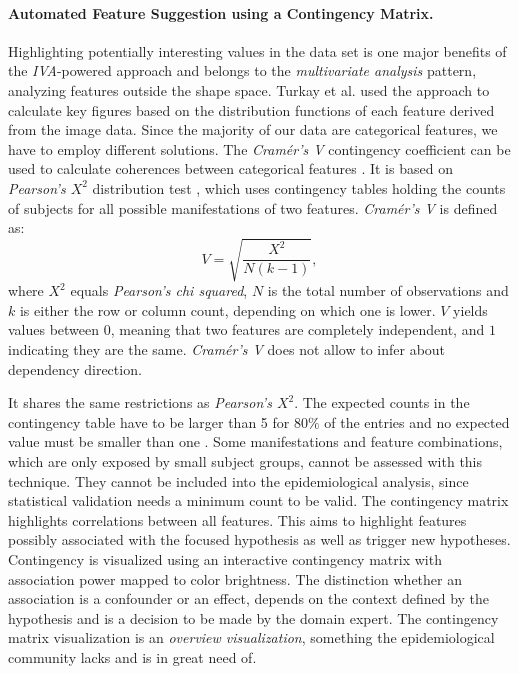 \documentclass[journal]{style/vgtc} 			          %
\newcommand{\rem}[1]{\textcolor{red}{\sout{#1}}}
\begin{document}
\paragraph{Automated Feature Suggestion using a Contingency Matrix.}
Highlighting potentially interesting values in the data set is one major benefits of the \emph{IVA}-powered approach and belongs to the \emph{multivariate analysis} pattern,  analyzing features outside the shape space.
%
Turkay et al. \cite{Turkay2013} used the approach to calculate key figures based on the distribution functions of each feature derived from the image data.
%
Since the majority of our data are categorical features, we have to employ different solutions.
%
The \emph{Cram\'{e}r's V} contingency coefficient can be used to calculate coherences between categorical features \cite{CramerV}.
%
It is based on \emph{Pearson's $X^2$} distribution test \cite{ChiSquare}, which uses contingency tables holding the counts of subjects for all possible manifestations of two features.
%
\emph{Cram\'{e}r's V} is defined as:
\begin{equation}
V = \sqrt{\frac{X^2}{N(k-1)}},
\end{equation}
where $X^2$ equals \emph{Pearson's chi squared}, $N$ is the total number of observations and $k$ is either the row or column count, depending on which one is lower.
%
$V$ yields values between $0$, meaning that two features are completely independent, and $1$ indicating they are the same.
%
\emph{Cram\'{e}r's V} does not allow to infer about dependency direction.
%

It shares the same restrictions as \emph{Pearson's $X^2$}.
%
The expected counts in the contingency table have to be larger than 5 for $80\%$ of the entries and no expected value must be smaller than one \cite{Cochran1952}.
%
Some manifestations and feature combinations, which are only exposed by small subject groups, cannot be assessed with this technique.
%
They cannot be included into the epidemiological analysis, since statistical validation needs a minimum count to be valid.
%
The contingency matrix highlights correlations between all features. %
%
This aims to highlight features possibly associated with the focused hypothesis as well as trigger new hypotheses.
%
Contingency is visualized using an interactive contingency matrix with association power mapped to color brightness.
%
The distinction whether an association is a confounder or an effect, depends on the context defined by the hypothesis and is a decision to be made by the domain expert.
%
The contingency matrix visualization is an \emph{overview visualization}, something the epidemiological community lacks and is in great need of.
\end{document}

